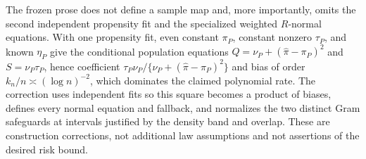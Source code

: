 The frozen prose does not define a sample map and, more importantly, omits the second independent propensity fit and the specialized weighted \(R\)-normal equations.  With one propensity fit, even constant \(\pi_P\), constant nonzero \(\tau_P\), and known \(\eta_P\) give the conditional population equations \(Q=\nu_P+(\widehat\pi-\pi_P)^2\) and \(S=\nu_P\tau_P\), hence coefficient \(\tau_P\nu_P/\{\nu_P+(\widehat\pi-\pi_P)^2\}\) and bias of order \(k_n/n\asymp(\log n)^{-2}\), which dominates the claimed polynomial rate.  The correction uses independent fits so this square becomes a product of biases, defines every normal equation and fallback, and normalizes the two distinct Gram safeguards at intervals justified by the density band and overlap.  These are construction corrections, not additional law assumptions and not assertions of the desired risk bound.